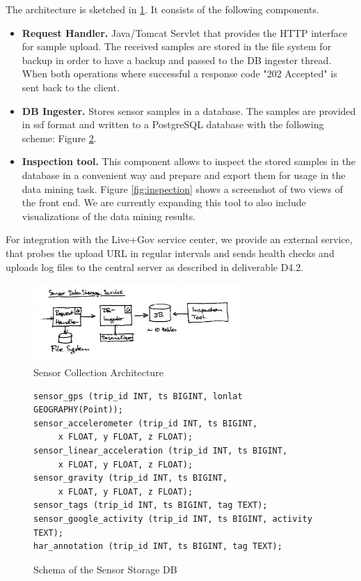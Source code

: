 The architecture is sketched in \ref{fig:ss_architecture}. It consists
of the following components.
\begin{itemize}
\item {\bf Request Handler.} Java/Tomcat Servlet that provides the
  HTTP interface for sample upload. The received samples are stored in
  the file system for backup in order to have a backup and passed to
  the DB ingester thread. When both operations where successful a
  response code "202 Accepted" is sent back to the client.
\item {\bf DB Ingester.} Stores sensor samples in a database. 
  The samples are provided in ssf format and written to a PostgreSQL
  database with the following scheme: Figure \ref{fig:db_scheme}.
\item {\bf Inspection tool.} This component allows to inspect the
  stored samples in the database in a convenient way and prepare and
  export them for usage in the data mining task. Figure
  \ref{fig:inspection} shows a screenshot of two views of the front
  end. We are currently expanding this tool to also include
  visualizations of the data mining results.
\end{itemize}

For integration with the Live+Gov service center, we provide an
external service, that probes the upload URL in regular intervals and
sends health checks and uploads log files to the central server as
described in deliverable D4.2.

\begin{figure}
\centering
\includegraphics[width=0.7\textwidth]{img/sc/ss_architecture.jpg}
\caption{Sensor Collection Architecture}\label{fig:ss_architecture}
\end{figure}

\begin{figure}
{\small
\begin{verbatim}
sensor_gps (trip_id INT, ts BIGINT, lonlat GEOGRAPHY(Point));
sensor_accelerometer (trip_id INT, ts BIGINT, 
     x FLOAT, y FLOAT, z FLOAT);
sensor_linear_acceleration (trip_id INT, ts BIGINT,
     x FLOAT, y FLOAT, z FLOAT);
sensor_gravity (trip_id INT, ts BIGINT, 
     x FLOAT, y FLOAT, z FLOAT);
sensor_tags (trip_id INT, ts BIGINT, tag TEXT);
sensor_google_activity (trip_id INT, ts BIGINT, activity TEXT);
har_annotation (trip_id INT, ts BIGINT, tag TEXT);
\end{verbatim}}
\label{fig:db_scheme}
\caption{Schema of the Sensor Storage DB}
\end{figure}

